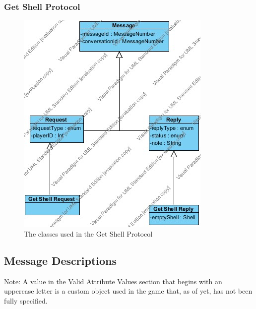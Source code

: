 \documentclass[12pt]{article}
\begin{document}
				\subsubsection{Get Shell Protocol}
					\begin{center}
						\begin{figure}[htp]
							\centering
							\includegraphics[width=.7\textwidth]{Diagrams/Class Diagrams/Get Shell Protocol.jpg}
							\caption{The classes used in the Get Shell Protocol}
						\end{figure}
					\end{center}
				\newpage
		\subsection{Message Descriptions}
		Note:
		A value in the Valid Attribute Values section that begins with an uppercase letter is a custom object used in the game that, as of yet, has not been fully specified.
			
\end{document}

